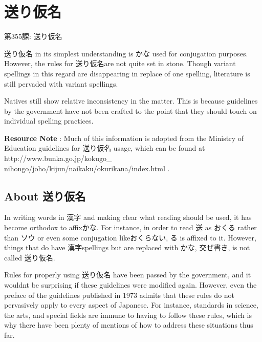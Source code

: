     
\chapter{送り仮名}

\begin{center}
\begin{Large}
第355課: 送り仮名 
\end{Large}
\end{center}
 
\par{ 送り仮名 in its simplest understanding is かな used for conjugation purposes. However, the rules for 送り仮名are not quite set in stone. Though variant spellings in this regard are disappearing in replace of one spelling, literature is still pervaded with variant spellings. }

\par{ Natives still show relative inconsistency in the matter. This is because guidelines by the government have not been crafted to the point that they should touch on individual spelling practices. }

\par{\textbf{Resource Note }: Much of this information is adopted from the Ministry of Education guidelines for 送り仮名 usage, which can be found at http:\slash \slash www.bunka.go.jp\slash kokugo\_ nihongo\slash joho\slash kijun\slash naikaku\slash okurikana\slash index.html  . }
      
\section{About 送り仮名}
 
\par{ In writing words in 漢字 and making clear what reading should be used, it has become orthodox to affixかな. For instance, in order to read 送 as おくる rather than ソウ or even some conjugation likeおくらない, る is affixed to it. However, things that do have 漢字spellings but are replaced with かな, 交ぜ書き, is not called 送り仮名. }

\par{ Rules for properly using 送り仮名 have been passed by the government, and it wouldn\textquotesingle t be surprising if these guidelines were modified again. However, even the preface of the guidelines published in 1973 admits that these rules do not pervasively apply to every aspect of Japanese. For instance, standards in science, the arts, and special fields are immune to having to follow these rules, which is why there have been plenty of mentions of how to address these situations thus far. }

